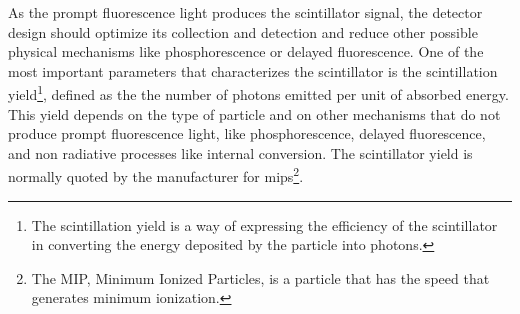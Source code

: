 As the prompt fluorescence light produces the scintillator signal, the detector design should optimize its collection and detection and reduce other possible physical mechanisms like phosphorescence or delayed fluorescence. One of the most important parameters that characterizes the scintillator is the scintillation yield\footnote{The scintillation yield is a way of expressing the efficiency of the scintillator in converting the energy deposited by the particle into photons.}, defined as the the number of photons emitted per unit of absorbed energy. This yield depends on the type of particle and on other mechanisms that do not produce prompt fluorescence light, like phosphorescence, delayed fluorescence, and non radiative processes like internal conversion. The scintillator yield is normally quoted by the manufacturer for mips\footnote{The MIP, Minimum Ionized Particles, is a particle that has the speed that generates minimum ionization.}.
